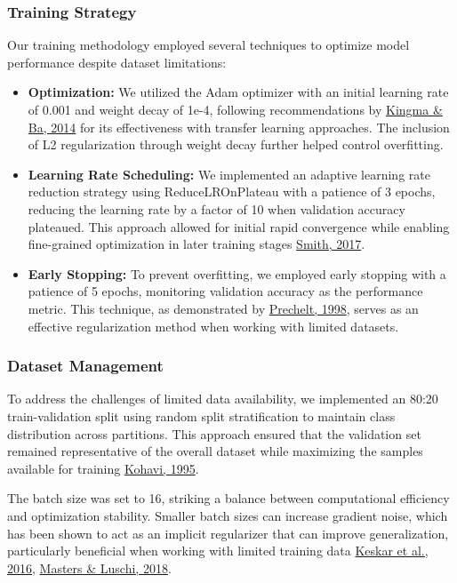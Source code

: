 \documentclass[a4paper,12pt]{article}
\begin{document}
\subsubsection{Training Strategy}

Our training methodology employed several techniques to optimize model performance despite dataset limitations:

\begin{itemize}
    \item \textbf{Optimization:} We utilized the Adam optimizer with an initial learning rate of 0.001 and weight decay of 1e-4, following recommendations by {\href{https://arxiv.org/abs/1412.6980}{Kingma \& Ba, 2014}} for its effectiveness with transfer learning approaches. The inclusion of L2 regularization through weight decay further helped control overfitting.
    
    \item \textbf{Learning Rate Scheduling:} We implemented an adaptive learning rate reduction strategy using ReduceLROnPlateau with a patience of 3 epochs, reducing the learning rate by a factor of 10 when validation accuracy plateaued. This approach allowed for initial rapid convergence while enabling fine-grained optimization in later training stages {\href{https://arxiv.org/abs/1506.01186}{Smith, 2017}}.
    
    \item \textbf{Early Stopping:} To prevent overfitting, we employed early stopping with a patience of 5 epochs, monitoring validation accuracy as the performance metric. This technique, as demonstrated by {\href{https://link.springer.com/chapter/10.1007/978-3-642-35289-8_5}{Prechelt, 1998}}, serves as an effective regularization method when working with limited datasets.
\end{itemize}

\subsubsection{Dataset Management}

To address the challenges of limited data availability, we implemented an 80:20 train-validation split using random split stratification to maintain class distribution across partitions. This approach ensured that the validation set remained representative of the overall dataset while maximizing the samples available for training {\href{https://dl.acm.org/doi/10.5555/1643031.1643047}{Kohavi, 1995}}.

The batch size was set to 16, striking a balance between computational efficiency and optimization stability. Smaller batch sizes can increase gradient noise, which has been shown to act as an implicit regularizer that can improve generalization, particularly beneficial when working with limited training data {\href{https://arxiv.org/abs/1609.04836}{Keskar et al., 2016}, \href{https://arxiv.org/abs/1804.07612}{Masters \& Luschi, 2018}}.
\end{document}
